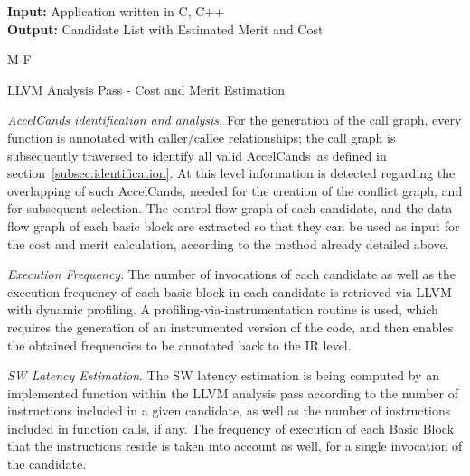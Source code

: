 \documentclass[]{usiinfthesis}
\newcommand{\candidates}{{AccelCand}s}
\begin{document}
\begin{algorithm}[t]
\begin{flushleft}
\textbf{Input:}  Application written in C, C++\\
\textbf{Output:} Candidate List with Estimated Merit and Cost\\
\end{flushleft}
\begin{algorithmic}[1]
 {M}
\EndFunction
\State
{} {F}
 \State
\EndFunction
\end{algorithmic}
\caption{LLVM Analysis Pass - Cost and Merit Estimation} 
\label{Algo_LLVM}
\end{algorithm}

\emph{AccelCands identification and analysis.} For the generation of
the call graph, every function is annotated with caller/callee relationships; 
the call graph is subsequently traversed to identify all valid \candidates\ as 
defined in section~\ref{subsec:identification}. At this level information is 
detected regarding the overlapping of such \candidates, needed for the creation 
of the conflict graph, and for subsequent selection. The control flow graph of 
each candidate, and the data flow graph of each basic block are extracted so 
that they can be used as input for the cost and merit calculation, according to 
the method already detailed above.\par

\emph{Execution Frequency}.  The number of invocations of each
candidate as well as the execution frequency of each basic block in
each candidate is retrieved via LLVM with dynamic profiling. A
profiling-via-instrumentation routine is used, which requires the generation
of an instrumented version of the code, and then enables the obtained
frequencies to be annotated back to the IR level.\par

\emph{SW Latency Estimation}. The SW latency estimation is being
computed by an implemented function within the LLVM analysis pass
according to the number of instructions included in a given candidate,
as well as the number of instructions included in function calls, if
any. The frequency of execution of each Basic Block that the
instructions reside is taken into account as well, for a single
invocation of the candidate.\par
\end{document}
